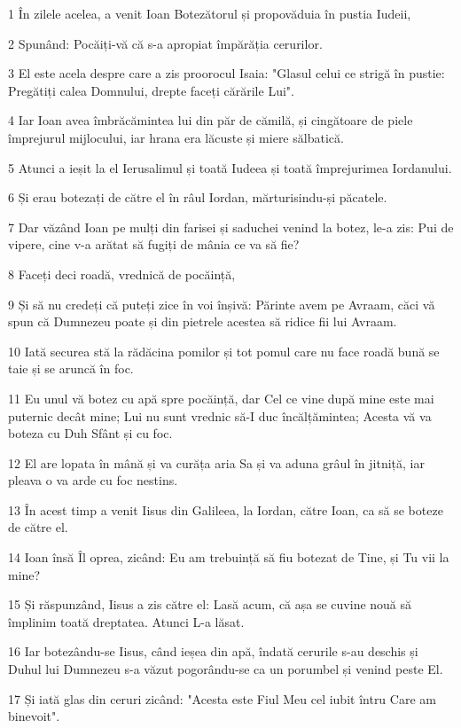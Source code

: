 \par 1 În zilele acelea, a venit Ioan Botezătorul și propovăduia în pustia Iudeii,
\par 2 Spunând: Pocăiți-vă că s-a apropiat împărăția cerurilor.
\par 3 El este acela despre care a zis proorocul Isaia: "Glasul celui ce strigă în pustie: Pregătiți calea Domnului, drepte faceți cărările Lui".
\par 4 Iar Ioan avea îmbrăcămintea lui din păr de cămilă, și cingătoare de piele împrejurul mijlocului, iar hrana era lăcuste și miere sălbatică.
\par 5 Atunci a ieșit la el Ierusalimul și toată Iudeea și toată împrejurimea Iordanului.
\par 6 Și erau botezați de către el în râul Iordan, mărturisindu-și păcatele.
\par 7 Dar văzând Ioan pe mulți din farisei și saduchei venind la botez, le-a zis: Pui de vipere, cine v-a arătat să fugiți de mânia ce va să fie?
\par 8 Faceți deci roadă, vrednică de pocăință,
\par 9 Și să nu credeți că puteți zice în voi înșivă: Părinte avem pe Avraam, căci vă spun că Dumnezeu poate și din pietrele acestea să ridice fii lui Avraam.
\par 10 Iată securea stă la rădăcina pomilor și tot pomul care nu face roadă bună se taie și se aruncă în foc.
\par 11 Eu unul vă botez cu apă spre pocăință, dar Cel ce vine după mine este mai puternic decât mine; Lui nu sunt vrednic să-I duc încălțămintea; Acesta vă va boteza cu Duh Sfânt și cu foc.
\par 12 El are lopata în mână și va curăța aria Sa și va aduna grâul în jitniță, iar pleava o va arde cu foc nestins.
\par 13 În acest timp a venit Iisus din Galileea, la Iordan, către Ioan, ca să se boteze de către el.
\par 14 Ioan însă Îl oprea, zicând: Eu am trebuință să fiu botezat de Tine, și Tu vii la mine?
\par 15 Și răspunzând, Iisus a zis către el: Lasă acum, că așa se cuvine nouă să împlinim toată dreptatea. Atunci L-a lăsat.
\par 16 Iar botezându-se Iisus, când ieșea din apă, îndată cerurile s-au deschis și Duhul lui Dumnezeu s-a văzut pogorându-se ca un porumbel și venind peste El.
\par 17 Și iată glas din ceruri zicând: "Acesta este Fiul Meu cel iubit întru Care am binevoit".

